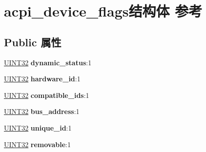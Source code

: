 \hypertarget{structacpi__device__flags}{}\section{acpi\+\_\+device\+\_\+flags结构体 参考}
\label{structacpi__device__flags}
\subsection*{Public 属性}
\begin{DoxyCompactItemize}
\item 
\mbox{\label{structacpi__device__flags_af80245d6a00a13e63802733a91929dd2}} 
\hyperlink{_processor_bind_8h_ae1e6edbbc26d6fbc71a90190d0266018}{U\+I\+N\+T32} {\bfseries dynamic\+\_\+status}\+:1
\item 
\mbox{\label{structacpi__device__flags_ae9df0ec69bfd2c2a38875594ff115674}} 
\hyperlink{_processor_bind_8h_ae1e6edbbc26d6fbc71a90190d0266018}{U\+I\+N\+T32} {\bfseries hardware\+\_\+id}\+:1
\item 
\mbox{\label{structacpi__device__flags_a9e5cf107b85c52c33af30eee97d1fe48}} 
\hyperlink{_processor_bind_8h_ae1e6edbbc26d6fbc71a90190d0266018}{U\+I\+N\+T32} {\bfseries compatible\+\_\+ids}\+:1
\item 
\mbox{\label{structacpi__device__flags_a75e02cf0adbbae2dea9c91da6330d3b1}} 
\hyperlink{_processor_bind_8h_ae1e6edbbc26d6fbc71a90190d0266018}{U\+I\+N\+T32} {\bfseries bus\+\_\+address}\+:1
\item 
\mbox{\label{structacpi__device__flags_a4b779a92f7fe84a64f90068152a289df}} 
\hyperlink{_processor_bind_8h_ae1e6edbbc26d6fbc71a90190d0266018}{U\+I\+N\+T32} {\bfseries unique\+\_\+id}\+:1
\item 
\mbox{\label{structacpi__device__flags_a1d37f92692c0d7acf70ae0bec7d98b7c}} 
\hyperlink{_processor_bind_8h_ae1e6edbbc26d6fbc71a90190d0266018}{U\+I\+N\+T32} {\bfseries removable}\+:1
\item 
\mbox{\label{structacpi__device__flags_aaa9ca71437b201d990bcf3b527377385}} 

\end{DoxyCompactItemize}
